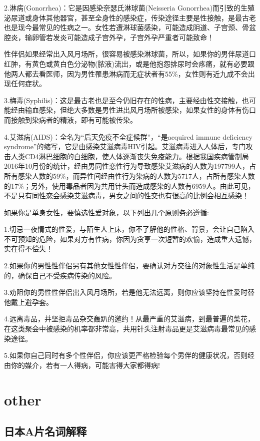 \documentclass[12pt,UTF8]{ctexbook}
\begin{document}
2.淋病(Gonorrhea)：它是因感染奈瑟氏淋球菌(Neisseria Gonorrhea)而引致的生殖泌尿道或身体其他器官，甚至全身性的感染症，传染途径主要是性接触，是最古老也是现今最常见的性病之一。女性若遭淋球菌感染，可能造成阴道、子宫颈、骨盆腔炎，输卵管若发炎可能造成子宫外孕，子宫外孕严重者可能致命！

性伴侣如果经常出入风月场所，很容易被感染淋球菌，所以，如果你的男伴尿道口红肿，有黄色或黄白色分泌物(脓液)流出，或是他抱怨排尿时会疼痛，就有必要跟他两人都去看医师，因为男性罹患淋病而无症状者有55\%，女性则有近九成不会出现任何症状。

3.梅毒(Syphilis)：这是最古老也是至今仍旧存在的性病，主要经由性交接触，也可能经由输血感染，但绝大多数是男性进出风月场所被感染，如果女性的身体有伤口而接触到染病者的精液，即有可能被传染。

4.艾滋病(AIDS)：全名为“后天免疫不全症候群”，“是acquired immune deficiency syndrome”的缩写，它是由感染艾滋病毒HIV引起。艾滋病毒进入人体后，专门攻击人类CD4淋巴细胞的白细胞，使人体逐渐丧失免疫能力。根据我国疾病管制局2016年10月份的统计，经由男同性恋性行为导致感染艾滋病的人数为197799人，占所有感染人数的59\%，而异性间经由性行为染病的人数为5717人，占所有感染人数的17\%；另外，使用毒品者因为共用针头而造成感染的人数有6959人。由此可见，不是只有同性恋会感染艾滋病毒，男女之间的性交也有很高的比例会相互感染！

如果你是单身女性，要慎选性爱对象，以下列出几个原则务必遵循:

1.切忌一夜情式的性爱，与陌生人上床，你不了解他的性格、背景，会让自己陷入不可预知的危险，如果对方有性病，你因为贪享一次短暂的欢愉，造成重大遗憾，实在得不偿失！

2.如果你的男性性伴侣另有其他女性性伴侣，要确认对方交往的对象性生活是单纯的，确保自己不受疾病传染的风险。

3.劝阻你的男性性伴侣出入风月场所，若是他无法远离，则你应该坚持在性爱时替他戴上避孕套。

4.远离毒品，并坚拒毒品杂交轰趴的邀约！从最严重的艾滋病，到最普遍的菜花，在这类聚会中被感染的机率都非常高，共用针头注射毒品更是艾滋病毒最常见的感染途径。

5.如果你自己同时有多个性伴侣，你应该更严格检验每个男伴的健康状况，否则经由你的媒介，若有一人得病，可能害得大家都得病!

\part{other}

\chapter{日本A片名词解释}
\end{document}
